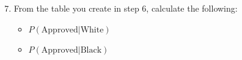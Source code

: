 \documentclass{article}
\begin{document}
\begin{enumerate}
    \setcounter{enumi}{6}
    \item From the table you create in step 6, calculate the following:
    \begin{itemize}
        \item $P(\text{Approved}|\text{White})$
        \item $P(\text{Approved}|\text{Black})$
    \end{itemize}
\end{enumerate}
\end{document}

